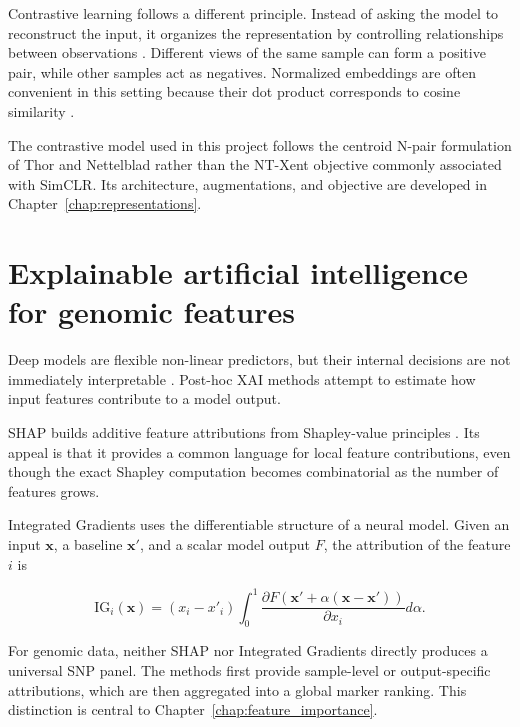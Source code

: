 Contrastive learning follows a different principle. Instead of asking
the model to reconstruct the input, it organizes the representation by
controlling relationships between observations
\cite{oord2018representation, chen2020simple}. Different views of the
same sample can form a positive pair, while other samples act as
negatives. Normalized embeddings are often convenient in this setting
because their dot product corresponds to cosine similarity
\cite{wang2020understanding}.

The contrastive model used in this project follows the centroid N-pair
formulation of Thor and Nettelblad \cite{thor2025contrastive} rather
than the NT-Xent objective commonly associated with SimCLR. Its
architecture, augmentations, and objective are developed in
Chapter~\ref{chap:representations}.



\section{Explainable artificial intelligence for genomic features}
\label{sec:explainable_ai_paradigms}

Deep models are flexible non-linear predictors, but their internal
decisions are not immediately interpretable
\cite{guidotti2018survey, arrieta2020explainable}. Post-hoc XAI
methods attempt to estimate how input features contribute to a model
output.

SHAP \cite{lundberg2017unified} builds additive feature attributions
from Shapley-value principles \cite{shapley1953value}. Its appeal is
that it provides a common language for local feature contributions,
even though the exact Shapley computation becomes combinatorial as the
number of features grows.

Integrated Gradients \cite{sundararajan2017axiomatic} uses the
differentiable structure of a neural model. Given an input
$\mathbf{x}$, a baseline $\mathbf{x}'$, and a scalar model output $F$,
the attribution of the feature $i$ is

\begin{equation}
    \mathrm{IG}_i(\mathbf{x})
    =
    (x_i-x'_i)
    \int_0^1
    \frac{
        \partial F\left(\mathbf{x}'+\alpha(\mathbf{x}-\mathbf{x}')\right)
    }{
        \partial x_i
    }
    d\alpha .
    \label{eq:integrated_gradients}
\end{equation}

For genomic data, neither SHAP nor Integrated Gradients directly
produces a universal SNP panel. The methods first provide sample-level or
output-specific attributions, which are then aggregated into a global
marker ranking.
This distinction is central to Chapter~\ref{chap:feature_importance}.

